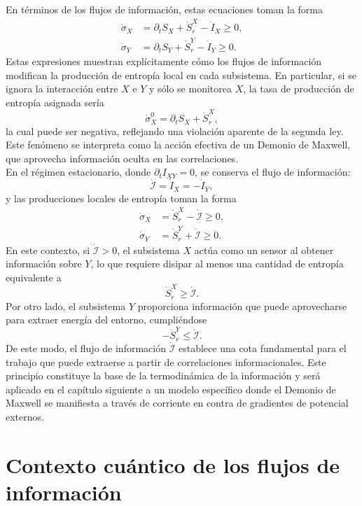 En términos de los flujos de información, estas ecuaciones toman la forma
\begin{align*}
    \dot{\sigma}_{X} & = \partial_{t}S_{X} + \dot{S}_{r}^{X} - \dot{I}_{X} \geq 0, \\
    \dot{\sigma}_{Y} & = \partial_{t}S_{Y} + \dot{S}_{r}^{Y} - \dot{I}_{Y} \geq 0.
\end{align*}
Estas expresiones muestran explícitamente cómo los flujos de información modifican la producción de entropía local en cada subsistema. En particular, si se ignora la interacción entre \( X \) e \( Y \) y sólo se monitorea \( X \), la tasa de producción de entropía asignada sería
\[
\dot{\sigma}_{X}^0 = \partial_{t} S_{X} + \dot{S}_{r}^{X},
\]
la cual puede ser negativa, reflejando una violación aparente de la segunda ley. Este fenómeno se interpreta como la acción efectiva de un Demonio de Maxwell, que aprovecha información oculta en las correlaciones.
\\

En el régimen estacionario, donde \( \partial_t I_{XY} = 0 \), se conserva el flujo de información:
\[
\dot{\mathcal{I}} = \dot{I}_{X} = -\dot{I}_{Y},
\]
y las producciones locales de entropía toman la forma
\begin{align*}
    \dot{\sigma}_{X} & = \dot{S}_{r}^{X} - \dot{\mathcal{I}} \geq 0, \\
    \dot{\sigma}_{Y} & = \dot{S}_{r}^{Y} + \dot{\mathcal{I}} \geq 0.
\end{align*}
En este contexto, si \( \dot{\mathcal{I}} > 0 \), el subsistema \( X \) actúa como un sensor al obtener información sobre \( Y \), lo que requiere disipar al menos una cantidad de entropía equivalente a
\[
\dot{S}_{r}^{X} \geq \dot{\mathcal{I}}.
\]
Por otro lado, el subsistema \( Y \) proporciona información que puede aprovecharse para extraer energía del entorno, cumpliéndose
\[
-\dot{S}_{r}^{Y} \leq \dot{\mathcal{I}}.
\]
De este modo, el flujo de información \( \dot{\mathcal{I}} \) establece una cota fundamental para el trabajo que puede extraerse a partir de correlaciones informacionales. Este principio constituye la base de la termodinámica de la información y será aplicado en el capítulo siguiente a un modelo específico donde el Demonio de Maxwell se manifiesta a través de corriente en contra de gradientes de potencial externos.

\section{Contexto cuántico de los flujos de información}

